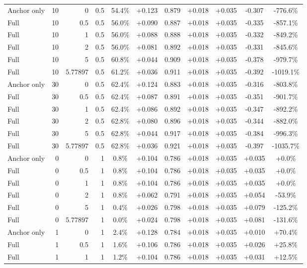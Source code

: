 \begin{table}[htbp]
\begin{tabular}{lrrrccccccc}
Anchor only & 10 & 0 & 0.5 & 54.4\% & +0.123 & 0.879 & +0.018 & +0.035 & -0.307 & -776.6\% \\
Full & 10 & 0.5 & 0.5 & 56.0\% & +0.090 & 0.887 & +0.018 & +0.035 & -0.335 & -857.1\% \\
Full & 10 & 1 & 0.5 & 56.0\% & +0.088 & 0.888 & +0.018 & +0.035 & -0.332 & -849.2\% \\
Full & 10 & 2 & 0.5 & 56.0\% & +0.081 & 0.892 & +0.018 & +0.035 & -0.331 & -845.6\% \\
Full & 10 & 5 & 0.5 & 60.8\% & +0.044 & 0.909 & +0.018 & +0.035 & -0.378 & -979.7\% \\
Full & 10 & 5.77897 & 0.5 & 61.2\% & +0.036 & 0.911 & +0.018 & +0.035 & -0.392 & -1019.1\% \\
Anchor only & 30 & 0 & 0.5 & 62.4\% & +0.124 & 0.883 & +0.018 & +0.035 & -0.316 & -803.8\% \\
Full & 30 & 0.5 & 0.5 & 62.4\% & +0.087 & 0.891 & +0.018 & +0.035 & -0.351 & -901.7\% \\
Full & 30 & 1 & 0.5 & 62.4\% & +0.086 & 0.892 & +0.018 & +0.035 & -0.347 & -892.2\% \\
Full & 30 & 2 & 0.5 & 62.8\% & +0.080 & 0.896 & +0.018 & +0.035 & -0.344 & -882.0\% \\
Full & 30 & 5 & 0.5 & 62.8\% & +0.044 & 0.917 & +0.018 & +0.035 & -0.384 & -996.3\% \\
Full & 30 & 5.77897 & 0.5 & 62.8\% & +0.036 & 0.921 & +0.018 & +0.035 & -0.397 & -1035.7\% \\
Anchor only & 0 & 0 & 1 & 0.8\% & +0.104 & 0.786 & +0.018 & +0.035 & +0.035 & +0.0\% \\
Full & 0 & 0.5 & 1 & 0.8\% & +0.104 & 0.786 & +0.018 & +0.035 & +0.035 & +0.0\% \\
Full & 0 & 1 & 1 & 0.8\% & +0.104 & 0.786 & +0.018 & +0.035 & +0.035 & +0.0\% \\
Full & 0 & 2 & 1 & 0.8\% & +0.062 & 0.791 & +0.018 & +0.035 & +0.054 & -53.9\% \\
Full & 0 & 5 & 1 & 0.4\% & +0.026 & 0.798 & +0.018 & +0.035 & +0.079 & -125.2\% \\
Full & 0 & 5.77897 & 1 & 0.0\% & +0.024 & 0.798 & +0.018 & +0.035 & +0.081 & -131.6\% \\
Anchor only & 1 & 0 & 1 & 2.4\% & +0.128 & 0.784 & +0.018 & +0.035 & +0.010 & +70.4\% \\
Full & 1 & 0.5 & 1 & 1.6\% & +0.106 & 0.786 & +0.018 & +0.035 & +0.026 & +25.8\% \\
Full & 1 & 1 & 1 & 1.2\% & +0.104 & 0.786 & +0.018 & +0.035 & +0.031 & +12.5\% \\

\end{tabular}
\end{table}
